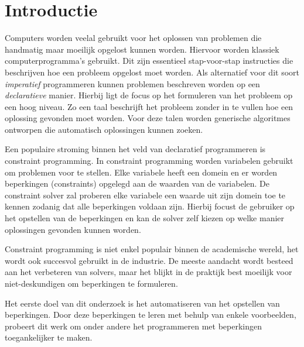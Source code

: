 \section{Introductie}

Computers worden veelal gebruikt voor het oplossen van problemen die handmatig maar moeilijk opgelost kunnen worden. 
Hiervoor worden klassiek computerprogramma's gebruikt.
Dit zijn essentieel stap-voor-stap instructies die beschrijven hoe een probleem opgelost moet worden.
Als alternatief voor dit soort \emph{imperatief} programmeren kunnen problemen beschreven worden op een \emph{declaratieve} manier.
Hierbij ligt de focus op het formuleren van het probleem op een hoog niveau.
Zo een taal beschrijft het probleem zonder in te vullen hoe een oplossing gevonden moet worden.
Voor deze talen worden generische algoritmes ontworpen die automatisch oplossingen kunnen zoeken.

Een populaire stroming binnen het veld van declaratief programmeren is constraint programming.
In constraint programming worden variabelen gebruikt om problemen voor te stellen.
Elke variabele heeft een domein en er worden beperkingen (constraints) opgelegd aan de waarden van de variabelen.
De constraint solver zal proberen elke variabele een waarde uit zijn domein toe te kennen zodanig dat alle beperkingen voldaan zijn.
Hierbij focust de gebruiker op het opstellen van de beperkingen en kan de solver zelf kiezen op welke manier oplossingen gevonden kunnen worden.

Constraint programming is niet enkel populair binnen de academische wereld, het wordt ook succesvol gebruikt in de industrie\cite{Simonis:IndustrialApplicationsCP}.
De meeste aandacht wordt besteed aan het verbeteren van solvers, maar het blijkt in de praktijk best moeilijk voor niet-deskundigen om beperkingen te formuleren\cite{Wallace:PrinciplesCP}.

Het eerste doel van dit onderzoek is het automatiseren van het opstellen van beperkingen.
Door deze beperkingen te leren met behulp van enkele voorbeelden, probeert dit werk om onder andere het programmeren met beperkingen toegankelijker te maken.

